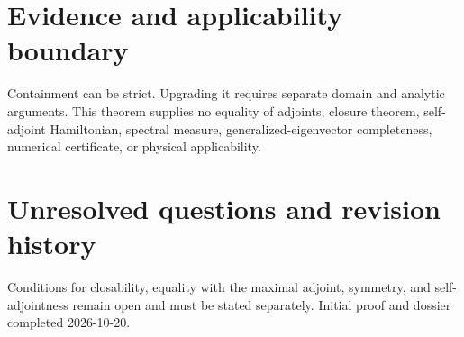 \documentclass[11pt]{article}
\begin{document}
\section{Evidence and applicability boundary}
Containment can be strict. Upgrading it requires separate domain and analytic arguments. This
theorem supplies no equality of adjoints, closure theorem, self-adjoint Hamiltonian, spectral
measure, generalized-eigenvector completeness, numerical certificate, or physical applicability.

\section{Unresolved questions and revision history}
Conditions for closability, equality with the maximal adjoint, symmetry, and self-adjointness remain
open and must be stated separately. Initial proof and dossier completed 2026-10-20.
\end{document}
